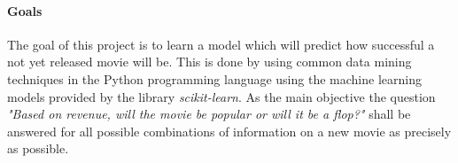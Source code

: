 \paragraph{Goals}
The goal of this project is to learn a model which will predict how successful a not yet released movie will be. This is done by using common data mining techniques in the Python programming language using the machine learning models provided by the library \textit{scikit-learn}.
As the main objective the question \textit{"Based on revenue, will the movie be popular or will it be a flop?"} shall be answered for all possible combinations of information on a new movie as precisely as possible.










 
